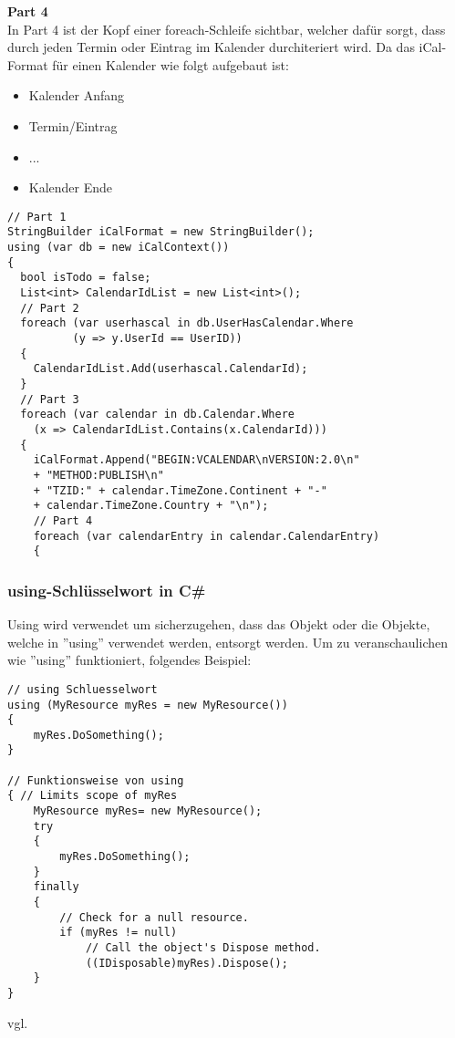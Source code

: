 \textbf{Part 4} \\
In Part 4 ist der Kopf einer foreach-Schleife sichtbar, welcher dafür sorgt, dass durch jeden Termin oder Eintrag im Kalender durchiteriert wird. Da das iCal-Format für einen Kalender wie folgt aufgebaut ist: 
\begin{itemize}
\item Kalender Anfang
\item Termin/Eintrag
\item ...
\item Kalender Ende
\end{itemize}

\begin{lstlisting}[caption=Parser Verbindung zur DB mit dem Entity Framework, label=lst:test]
// Part 1
StringBuilder iCalFormat = new StringBuilder();
using (var db = new iCalContext())
{
  bool isTodo = false;
  List<int> CalendarIdList = new List<int>();
  // Part 2
  foreach (var userhascal in db.UserHasCalendar.Where
  		  (y => y.UserId == UserID))
  {
	CalendarIdList.Add(userhascal.CalendarId);
  }
  // Part 3
  foreach (var calendar in db.Calendar.Where
  	(x => CalendarIdList.Contains(x.CalendarId)))
  {
    iCalFormat.Append("BEGIN:VCALENDAR\nVERSION:2.0\n"
	+ "METHOD:PUBLISH\n"
	+ "TZID:" + calendar.TimeZone.Continent + "-" 
	+ calendar.TimeZone.Country + "\n");
    // Part 4
    foreach (var calendarEntry in calendar.CalendarEntry)
    {
\end{lstlisting} 
\subsubsection{using-Schlüsselwort in C\#}
\label{usingkeyword}
Using wird verwendet um sicherzugehen, dass das Objekt oder die Objekte, welche in ''using'' verwendet werden, entsorgt werden. Um zu veranschaulichen wie ''using'' funktioniert, folgendes Beispiel:

\begin{lstlisting}[caption=Parser funktionsweise von using, label=lst:test]
// using Schluesselwort
using (MyResource myRes = new MyResource())
{
    myRes.DoSomething();
}
 
// Funktionsweise von using 
{ // Limits scope of myRes
    MyResource myRes= new MyResource();
    try
    {
        myRes.DoSomething();
    }
    finally
    {
        // Check for a null resource.
        if (myRes != null)
            // Call the object's Dispose method.
            ((IDisposable)myRes).Dispose();
    }
}
\end{lstlisting} 
vgl. \cite{ParserUsingKeyword}
